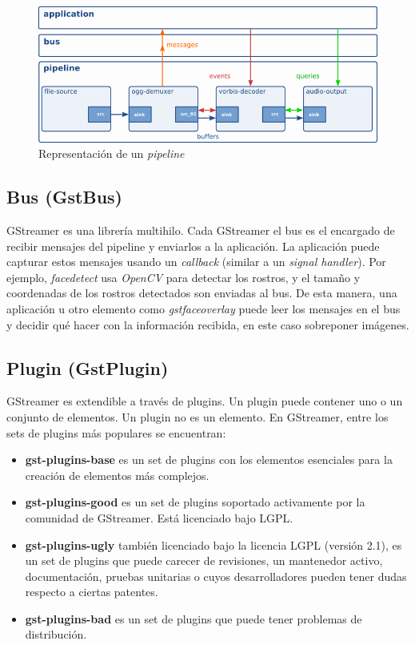 \documentclass[a4paper,openright,12pt]{report}
\begin{document}
\begin{figure}[h]
  \centering
    \includegraphics[width=\textwidth]{../images/ad-pipeline.png}\par
  \caption{Representación de un \textit{pipeline}}
\end{figure}

\subsection{Bus (GstBus)}
GStreamer es una librería multihilo. Cada GStreamer el bus es el encargado de
recibir mensajes del pipeline y enviarlos a la aplicación. La aplicación puede
capturar estos mensajes usando un \textit{callback} (similar a un
\textit{signal handler}). Por ejemplo, \textit{facedetect} usa \textit{OpenCV}
para detectar los rostros, y el tamaño y coordenadas de los rostros detectados
son enviadas al bus. De esta manera, una aplicación u otro elemento como
\textit{gstfaceoverlay} puede leer los mensajes en el bus y decidir qué hacer
con la información recibida, en este caso sobreponer imágenes.
\subsection{Plugin (GstPlugin)}
GStreamer es extendible a través de plugins. Un plugin puede contener uno o un
conjunto de elementos. Un plugin no es un elemento. En GStreamer, entre los
sets de plugins más populares se encuentran:
\begin{itemize}
\item \textbf{gst-plugins-base} es un set de plugins con los elementos esenciales para
la creación de elementos más complejos.
\item \textbf{gst-plugins-good} es un set de plugins soportado activamente por
la comunidad de GStreamer. Está licenciado bajo LGPL.
\item \textbf{gst-plugins-ugly} también licenciado bajo la licencia LGPL
(versión 2.1), es un set de plugins que puede carecer de revisiones, un
mantenedor activo, documentación, pruebas unitarias o cuyos desarrolladores
pueden tener dudas respecto a ciertas patentes.
\item \textbf{gst-plugins-bad} es un set de plugins que puede tener problemas
de distribución.
\end{itemize}
\end{document}
